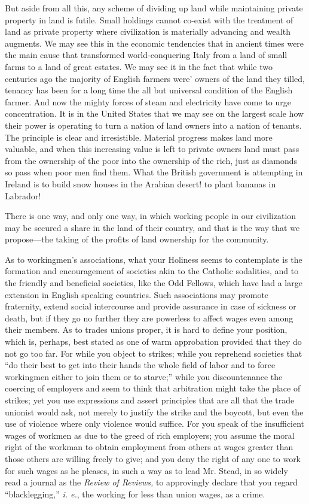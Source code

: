 \documentclass{book}
\begin{document}
But aside from all this, any scheme of dividing up land while maintaining private property in land is futile. Small holdings cannot co-exist with the treatment of land as private property where civilization is materially advancing and wealth augments. We may see this in the economic tendencies that in ancient times were the main cause that transformed world-conquering Italy from a land of small farms to a land of great estates. We may see it in the fact that while two centuries ago the majority of English farmers were’ owners of the land they tilled, tenancy has been for a long time the all but universal condition of the English farmer. And now the mighty forces of steam and electricity have come to urge concentration. It is in the United States that we may see on the largest scale how their power is operating to turn a nation of land owners into a nation of tenants. The principle is clear and irresistible. Material progress makes land more valuable, and when this increasing value is left to private owners land must pass from the ownership of the poor into the ownership of the rich, just as diamonds so pass when poor men find them. What the British government is attempting in Ireland is to build snow houses in the Arabian desert! to plant bananas in Labrador!

There is one way, and only one way, in which working people in our civilization may be secured a share in the land of their country, and that is the way that we propose—the taking of the profits of land ownership for the community.

As to workingmen’s associations, what your Holiness seems to contemplate is the formation and encouragement of societies akin to the Catholic sodalities, and to the friendly and beneficial societies, like the Odd Fellows, which have had a large extension in English speaking countries. Such associations may promote fraternity, extend social intercourse and provide assurance in case of sickness or death, but if they go no further they are powerless to affect wages even among their members. As to trades unions proper, it is hard to define your position, which is, perhaps, best stated as one of warm approbation provided that they do not go too far. For while you object to strikes; while you reprehend societies that “do their best to get into their hands the whole field of labor and to force workingmen either to join them or to starve;” while you discountenance the coercing of employers and seem to think that arbitration might take the place of strikes; yet you use expressions and assert principles that are all that the trade unionist would ask, not merely to justify the strike and the boycott, but even the use of violence where only violence would suffice. For you speak of the insufficient wages of workmen as due to the greed of rich employers; you assume the moral right of the workman to obtain employment from others at wages greater than those others are willing freely to give; and you deny the right of any one to work for such wages as he pleases, in such a way as to lead Mr. Stead, in so widely read a journal as the \emph{Review of Reviews,} to approvingly declare that you regard “blacklegging,” \emph{i. e.}, the working for less than union wages, as a crime.
\end{document}

